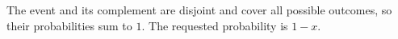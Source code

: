 The event and its complement are disjoint and cover all possible outcomes, so their probabilities sum to $1$. The requested probability is $\boxed{1-x}$.
